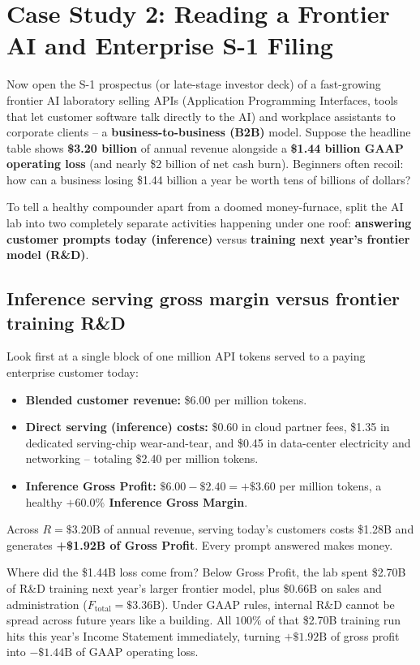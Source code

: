 \section{Case Study 2: Reading a Frontier AI and Enterprise S-1 Filing}

Now open the S-1 prospectus (or late-stage investor deck) of a fast-growing frontier AI laboratory selling APIs (Application Programming Interfaces, tools that let customer software talk directly to the AI) and workplace assistants to corporate clients -- a \textbf{business-to-business (B2B)} model. Suppose the headline table shows \textbf{\$3.20 billion} of annual revenue alongside a \textbf{\$1.44 billion GAAP operating loss} (and nearly \$2 billion of net cash burn). Beginners often recoil: how can a business losing \$1.44 billion a year be worth tens of billions of dollars?

To tell a healthy compounder apart from a doomed money-furnace, split the AI lab into two completely separate activities happening under one roof: \textbf{answering customer prompts today (inference)} versus \textbf{training next year's frontier model (R\&D)}.

\subsection{Inference serving gross margin versus frontier training R\&D}

Look first at a single block of one million API tokens served to a paying enterprise customer today:
\begin{itemize}
  \item \textbf{Blended customer revenue:} \$6.00 per million tokens.
  \item \textbf{Direct serving (inference) costs:} \$0.60 in cloud partner fees, \$1.35 in dedicated serving-chip wear-and-tear, and \$0.45 in data-center electricity and networking -- totaling \$2.40 per million tokens.
  \item \textbf{Inference Gross Profit:} $\$6.00 - \$2.40 = +\$3.60$ per million tokens, a healthy \textbf{$+60.0\%$ Inference Gross Margin}.
\end{itemize}
Across $R = \$3.20\text{B}$ of annual revenue, serving today's customers costs \$1.28B and generates \textbf{+\$1.92B of Gross Profit}. Every prompt answered makes money.

Where did the \$1.44B loss come from? Below Gross Profit, the lab spent \$2.70B of R\&D training next year's larger frontier model, plus \$0.66B on sales and administration ($F_{\text{total}} = \$3.36\text{B}$). Under GAAP rules, internal R\&D cannot be spread across future years like a building. All $100\%$ of that \$2.70B training run hits this year's Income Statement immediately, turning $+\$1.92\text{B}$ of gross profit into $-\$1.44\text{B}$ of GAAP operating loss.

